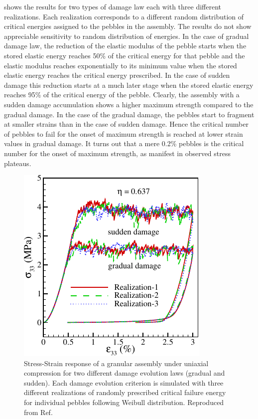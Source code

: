  shows the results for two types of damage law each with three different realizations.\cite{ying2011isfnt} Each realization corresponds to a different random distribution of critical energies assigned to the pebbles in the assembly. The results do not show appreciable sensitivity to random distribution of energies. In the case of gradual damage law, the reduction of the elastic modulus of the pebble starts when the stored elastic energy reaches 50\% of the critical energy for that pebble and the elastic modulus reaches exponentially to its minimum value when the stored elastic energy reaches the critical energy prescribed. In the case of sudden damage this reduction starts at a much later stage when the stored elastic energy reaches 95\% of the critical energy of the pebble. Clearly, the assembly with a sudden damage accumulation shows a higher maximum strength compared to the gradual damage. In the case of the gradual damage, the pebbles start to fragment at smaller strains than in the case of sudden damage. Hence the critical number of pebbles to fail for the onset of maximum strength is reached at lower strain values in gradual damage. It turns out that a mere 0.2\% pebbles is the critical number for the onset of maximum strength, as manifest in observed stress plateaus.

\begin{figure}[!ht]
\centering
\includegraphics[width=\singleimagewidth]{figures/Fig-5}
\caption{Stress-Strain response of a granular assembly under uniaxial compression for two different damage evolution laws (gradual and sudden). Each damage evolution criterion is simulated with three different realizations of randomly prescribed critical failure energy for individual pebbles following Weibull distribution. Reproduced from Ref.\cite{ying2011isfnt}}
\label{fig:stress-strain-effect}
\end{figure}

